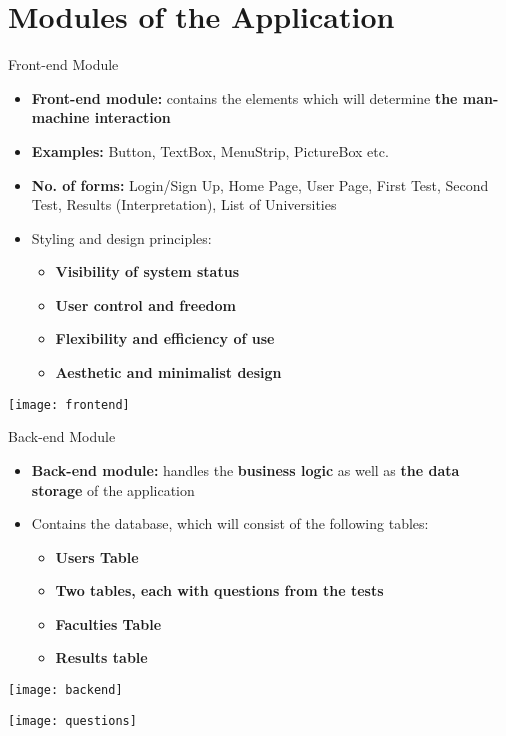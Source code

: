 \documentclass{beamer}
\begin{document}

\section{Modules of the Application}

\begin{frame}{Front-end Module}
	
	\begin{itemize}
		\item \textbf{Front-end module:} contains the elements which will determine\textbf{ the man-machine interaction}
		\item \textbf{Examples:} Button, TextBox, MenuStrip, PictureBox etc.
		\item \textbf{No. of forms: }Login/Sign Up, Home Page, User Page, First Test, Second Test, Results (Interpretation), List of Universities
		\item Styling and design principles:
			\begin{itemize}
				\item  \textbf{Visibility of system status}
				\item \textbf{User control and freedom}
				\item \textbf{Flexibility and efficiency of use}
				\item \textbf{Aesthetic and minimalist design} 
			\end{itemize}
	\end{itemize}
	\vspace{-1.75cm}
	\hspace{7cm}
	\centering
	\texttt{[image: frontend]}
	
	

\end{frame}

\begin{frame}{Back-end Module}
		\begin{itemize}
			\item \textbf{Back-end module:} handles the \textbf{business logic} as well as \textbf{the data storage} of the application
			\item Contains the database, which will consist of the following tables:
				\begin{itemize}
					\item \textbf{Users Table}
					\item \textbf{Two tables, each with questions from the tests}
					\item \textbf{Faculties Table}
					\item \textbf{Results table}
				\end{itemize}
		\end{itemize}
	
\vspace{-0.75cm}
\hspace{7cm}
\centering
\texttt{[image: backend]}
	
\end{frame}



\begin{frame}

\centering
\texttt{[image: questions]}

\end{frame}

\end{document}
